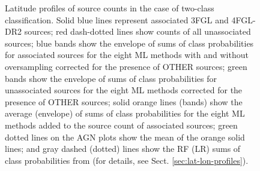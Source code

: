 \documentclass[referee]{aa} %
\begin{document}
\begin{figure}[h]
\caption{Latitude profiles of source counts in the case of two-class classification. 
Solid blue lines represent associated 3FGL and 4FGL-DR2  sources; red dash-dotted lines show counts of all unassociated sources; 
blue bands show the envelope of sums of class probabilities for associated sources for the eight ML methods with and without oversampling
corrected for the presence of OTHER sources; 
green bands show the envelope of sums of class probabilities for unassociated sources for the eight ML methods corrected for the presence of OTHER sources; 
solid orange lines (bands) show the average (envelope) of sums of class probabilities for the eight ML methods added to the source count of associated sources; 
green dotted lines on the AGN plots show the mean of the orange solid lines; and gray dashed (dotted) lines show the RF (LR) sums of class probabilities from \cite{2016ApJ...820....8S} (for details, see Sect. \ref{sec:lat-lon-profiles}). }  
\label{fig:lat_profile}
\end{figure}
\end{document}
